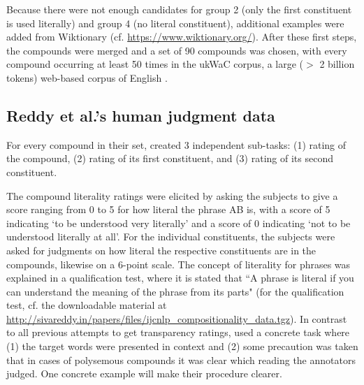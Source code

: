 
Because there were not enough candidates for group 2 (only the first
constituent is used
literally) and group 4 (no literal constituent), additional examples were added
from Wiktionary (cf. \url{https://www.wiktionary.org/}). After these first steps, the compounds were merged and a set
of 90 compounds was chosen, with every compound occurring at least  50
times in the ukWaC corpus, a large ($>$ 2 billion tokens) web-based corpus of English \citep[cf.][]{Ferraresietal:2008}. %


\subsection{Reddy et al.'s human judgment data}

For every compound in their set,
\citet{Reddyetal:2011} created 3 independent sub-tasks: (1) rating of the compound,
(2) rating of its
first constituent, and (3) rating of its second constituent. 

The compound literality ratings were elicited by asking the subjects
to give a score ranging from 0 to 5 for how literal the phrase AB is,
with a score of 5 indicating `to be understood very literally' and a
score of 0 indicating `not to be understood literally at all'. For the
individual constituents, the subjects were asked for judgments on how literal the respective
constituents are in the compounds, likewise on a 6-point scale. The
concept of literality for phrases was explained in a qualification
test, where it is stated that ``A phrase is literal if you can
understand the meaning of the phrase from its parts" (for the
qualification test, cf. the downloadable material at
\url{http://sivareddy.in/papers/files/ijcnlp_compositionality_data.tgz}).
In contrast to all previous attempts to get transparency ratings,
\citet{Reddyetal:2011} used a concrete task where (1) the target words
were presented in context and (2) some precaution was taken that in
cases of polysemous compounds it was clear which reading the
annotators judged. One concrete example will make their procedure
clearer. 

